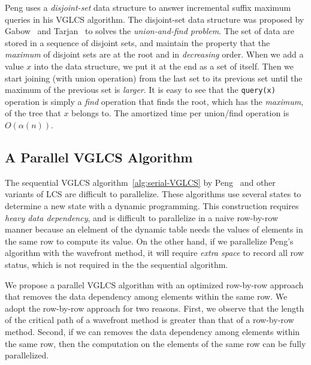 Peng uses a {\em disjoint-set} data structure to answer incremental
suffix maximum queries in his VGLCS algorithm.  The disjoint-set data
structure was proposed by Gabow~\cite{Gabow1983ALA} and
Tarjan~\cite{Tarjan1975EfficiencyOA} to solves the {\em union-and-find
  problem}.  The set of data are stored in a sequence of disjoint
sets, and maintain the property that the {\em maximum} of disjoint
sets are at the root and in {\em decreasing} order.  When we add a
value $x$ into the data structure, we put it at the end as a set of
itself.  Then we start joining (with union operation) from the last
set to its previous set until the maximum of the previous set is {\em
  larger}.  It is easy to see that the {\tt query(x)} operation is
simply a {\em find} operation that finds the root, which has the {\em
  maximum}, of the tree that $x$ belongs to.  The amortized time per
union/find operation is $O(\alpha(n))$.

\subsection{A Parallel VGLCS Algorithm}

The sequential VGLCS algorithm~\ref{alg:serial-VGLCS} by
Peng~\cite{Peng2011TheLC} and other variants of LCS are difficult to
parallelize.  These algorithms use several states to determine a new
state with a dynamic programming.  This construction requires {\em
  heavy data dependency}, and is difficult to parallelize in a naive
row-by-row manner because an elelment of the dynamic table needs the
values of elements in the same row to compute its value.  On the other
hand, if we parallelize Peng's algorithm with the wavefront method, it
will require {\em extra space} to record all row status, %
which is not required in the the sequential algorithm.



We propose a parallel VGLCS algorithm with an optimized row-by-row
approach that removes the data dependency among elements within the
same row.  We adopt the row-by-row approach for two reasons.  First,
we observe that the length of the critical path of a wavefront method
is greater than that of a row-by-row method.  Second, if we can
removes the data dependency among elements within the same row, then
the computation on the elements of the same row can be fully
parallelized.

